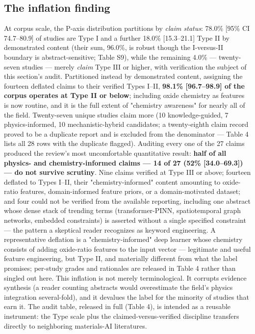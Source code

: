 \documentclass[pdflatex,sn-basic]{sn-jnl}
\begin{document}
\subsection{The inflation finding}

At corpus scale, the P-axis distribution partitions by \emph{claim status}: 78.0\% [95\% CI 74.7--80.9] of studies are Type I and a further 18.0\% [15.3--21.1] Type II by demonstrated content (their sum, 96.0\%, is robust though the I-versus-II boundary is abstract-sensitive; Table S9), while the remaining 4.0\% --- twenty-seven studies --- merely \emph{claim} Type III or higher, with verification the subject of this section's audit. Partitioned instead by demonstrated content, assigning the fourteen deflated claims to their verified Types I--II, \textbf{98.1\% [96.7--98.9] of the corpus operates at Type II or below}; including oxide chemistry as features is now routine, and it is the full extent of "chemistry awareness" for nearly all of the field. Twenty-seven unique studies claim more (10 knowledge-guided, 7 physics-informed, 10 mechanistic-hybrid candidates; a twenty-eighth claim record proved to be a duplicate report and is excluded from the denominator --- Table 4 lists all 28 rows with the duplicate flagged). Auditing every one of the 27 claims produced the review's most uncomfortable quantitative result: \textbf{half of all physics- and chemistry-informed claims --- 14 of 27 (52\% [34.0--69.3]) --- do not survive scrutiny}. Nine claims verified at Type III or above; fourteen deflated to Types I--II, their "chemistry-informed" content amounting to oxide-ratio features, domain-informed feature priors, or a domain-motivated dataset; and four could not be verified from the available reporting, including one abstract whose dense stack of trending terms (transformer-PINN, spatiotemporal graph networks, embedded constraints) is asserted without a single specified constraint --- the pattern a skeptical reader recognizes as keyword engineering. A representative deflation is a "chemistry-informed" deep learner whose chemistry consists of adding oxide-ratio features to the input vector --- legitimate and useful feature engineering, but Type II, and materially different from what the label promises; per-study grades and rationales are released in Table 4 rather than singled out here. This inflation is not merely terminological. It corrupts evidence synthesis (a reader counting abstracts would overestimate the field's physics integration several-fold), and it devalues the label for the minority of studies that earn it. The audit table, released in full (Table 4), is intended as a reusable instrument: the Type scale plus the claimed-versus-verified discipline transfers directly to neighboring materials-AI literatures.
\end{document}
